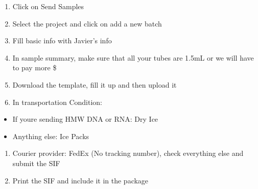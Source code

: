 \documentclass[
]{book}
\providecommand{\tightlist}{%
  \setlength{\itemsep}{0pt}\setlength{\parskip}{0pt}}
\begin{document}
\begin{enumerate}
\def\labelenumi{\arabic{enumi}.}
\setcounter{enumi}{1}
\item
  Click on Send Samples
\item
  Select the project and click on add a new batch
\item
  Fill basic info with Javier's info
\item
  In sample summary, make sure that all your tubes are 1.5mL or we will have to pay more \$
\item
  Download the template, fill it up and then upload it
\item
  In transportation Condition:
\end{enumerate}

\begin{itemize}
\tightlist
\item
  If youre sending HMW DNA or RNA: Dry Ice
\item
  Anything else: Ice Packs
\end{itemize}

\begin{enumerate}
\def\labelenumi{\arabic{enumi}.}
\setcounter{enumi}{7}
\item
  Courier provider: FedEx (No tracking number), check everything else and submit the SIF
\item
  Print the SIF and include it in the package
\end{enumerate}

  
\end{document}
